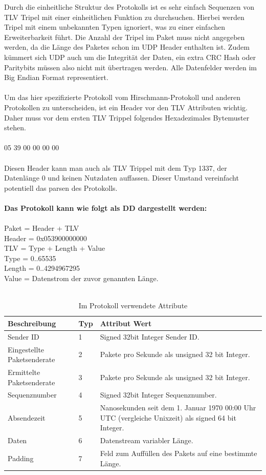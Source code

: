 Durch die einheitliche Struktur des Protokolls ist es sehr einfach Sequenzen von
TLV Tripel mit einer einheitlichen Funktion zu durchsuchen.
Hierbei werden Tripel mit einem unbekannten Typen ignoriert, was zu einer 
einfachen Erweiterbarkeit führt. Die Anzahl der Tripel im Paket muss nicht 
angegeben werden, da die Länge des Paketes schon im UDP Header enthalten ist.
Zudem kümmert sich UDP auch um die Integrität der Daten, ein extra CRC Hash oder
Paritybits müssen also nicht mit übertragen werden. Alle Datenfelder werden
im Big Endian Format representiert.
\\ \\
Um das hier spezifizierte Protokoll vom Hirschmann-Protokoll und anderen
Protokollen zu unterscheiden, ist ein Header vor den TLV Attributen wichtig. Daher muss vor dem ersten TLV Trippel 
folgendes Hexadezimales Bytemuster stehen.
\\ \\
05 39 00 00 00 00
\\ \\
Diesen Header kann man auch als TLV Trippel mit dem Typ 1337, der Datenlänge
0 und keinen Nutzdaten auffassen. Dieser Umstand vereinfacht potentiell das parsen des Protokolls.
\\ \\
\textbf{Das Protokoll kann wie folgt als DD dargestellt werden:} \\ \\
Paket = Header + {TLV} \\
Header = 0x053900000000 \\
TLV = Type + Length + Value  \\
Type = 0..65535  \\
Length = 0..4294967295 \\
Value = Datenstrom der zuvor genannten Länge. \\
\\ 
\begin{table}[htdp]
\centering
\caption{Im Protokoll verwendete Attribute}
\label{tab:prot}
\begin{tabular}{|l|l|p{9.5cm}|}
\hline
\textbf{Beschreibung} & \textbf{Typ} & \textbf{Attribut Wert} \\
\hline
Sender ID & 1 & Signed 32bit Integer Sender ID.\\
\hline
Eingestellte Paketsenderate & 2 & Pakete pro Sekunde als unsigned 32 bit Integer. \\
\hline
Ermittelte Paketsenderate & 3 & Pakete pro Sekunde als unsigned 32 bit Integer. \\
\hline
Sequenznumber & 4 & Signed 32bit Integer Sequenznumber. \\
\hline
Absendezeit & 5 & Nanosekunden seit dem 1. Januar 1970 00:00 Uhr UTC (vergleiche Unixzeit) als signed 64 bit Integer. \\
\hline
Daten & 6 & Datenstream variabler Länge. \\
\hline
Padding & 7 & Feld zum Auffüllen des Pakets auf eine bestimmte Länge. \\
\hline
\end{tabular}
\end{table}


